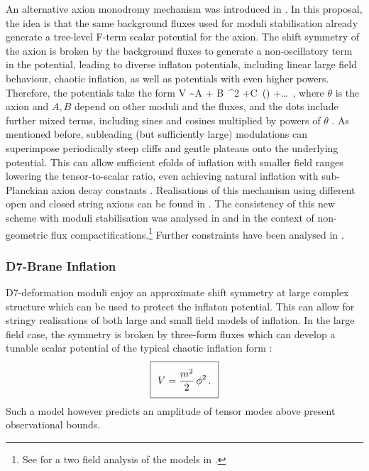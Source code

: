 An alternative axion monodromy mechanism was introduced in \cite{Marchesano:2014mla,Blumenhagen:2014gta,Hebecker:2014eua}. In this proposal, the idea is that the same background fluxes used for moduli stabilisation already generate a tree-level F-term scalar potential for the axion. The shift symmetry of the axion is broken by the background  fluxes to generate a non-oscillatory term in the potential, leading to diverse inflaton potentials, including linear large field behaviour, chaotic inflation, as well as potentials with even higher powers. Therefore, the potentials take the form 
\be
 V \sim A + B\, \theta^2 +C\, \theta \cos(\theta) +\dots \, ,
 \ee
 where $\theta$ is the axion  and $A, B$ depend on  other moduli and the fluxes, and the dots include further mixed terms, including sines and cosines multiplied by powers of $\theta$ \cite{Flauger:2014ana,Kobayashi:2015aaa,CaboBizet:2016uzv}. As mentioned before,  subleading (but sufficiently large) modulations can superimpose periodically steep cliffs and gentle plateaus onto the underlying potential. This can allow sufficient efolds of inflation with smaller field ranges lowering the tensor-to-scalar ratio, even achieving natural inflation with sub-Planckian axion decay constants \cite{Parameswaran:2016qqq,Kadota:2016jlw,Ozsoy:2018flq}. Realisations of this mechanism using different open and closed string axions can be found in \cite{Ibanez:2014kia,Franco:2014hsa,Hayashi:2014aua,Ibanez:2014swa,Garcia-Etxebarria:2014wla,Escobar:2015fda,Escobar:2015ckf,Hebecker:2015tzo,CaboBizet:2016uzv,Landete:2016cix}. 
The consistency of this new scheme with moduli stabilisation was analysed in \cite{Blumenhagen:2014nba,Hebecker:2014kva} and \cite{Blumenhagen:2015kja,Blumenhagen:2015qda,Blumenhagen:2015xpa} in the context of non-geometric flux compactifications.\footnote{See \cite{Damian:2018tlf} for a two field analysis of the models in \cite{Blumenhagen:2015kja}.} Further constraints have been analysed in \cite{Landete:2017amp,Kim:2018vgz}.

\subsubsection*{D7-Brane Inflation}

D7-deformation moduli enjoy an approximate shift symmetry at large complex structure which can be used to protect the inflaton potential. This can allow for stringy realisations of both large and small field models of inflation. In the large field case, the symmetry is broken by three-form fluxes which can develop a tunable scalar potential of the typical chaotic inflation form \cite{Hebecker:2014eua}:
\begin{equation}
\setlength\fboxsep{0.25cm}
\setlength\fboxrule{0.4pt}
\boxed{
V = \frac{m^2}{2}\,\phi^2\,.
}
\end{equation}
Such a model however predicts an amplitude of tensor modes above present observational bounds. 

